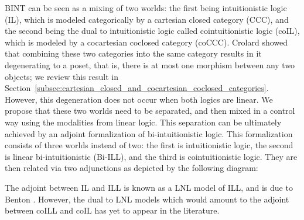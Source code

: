 \documentclass{lmcs}
\begin{document}
BINT can be seen as a mixing of two worlds: the first being
intuitionistic logic (IL), which is modeled categorically by a
cartesian closed category (CCC), and the second being the dual to
intuitionistic logic called cointuitionistic logic (coIL), which is
modeled by a cocartesian coclosed category (coCCC).  Crolard
\cite{Crolard:2001} showed that combining these two categories into
the same category results in it degenerating to a poset, that is,
there is at most one morphism between any two objects; we review this
result in
Section~\ref{subsec:cartesian_closed_and_cocartesian_coclosed_categories}.
However, this degeneration does not occur when both logics are linear.
We propose that these two worlds need to be separated, and then mixed
in a control way using the modalities from linear logic.  This
separation can be ultimately achieved by an adjoint formalization of
bi-intuitionistic logic.  This formalization consists of three worlds
instead of two: the first is intuitionistic logic, the second is
linear bi-intuitionistic (Bi-ILL), and the third is cointuitionistic
logic.  They are then related via two adjunctions as depicted by the
following diagram:
\begin{center}
    
\end{center}
The adjoint between IL and ILL is known as a LNL model of ILL, and is
due to Benton \cite{Benton:1994}.  However, the dual to LNL models
which would amount to the adjoint between coILL and coIL has yet to
appear in the literature.
\end{document}
